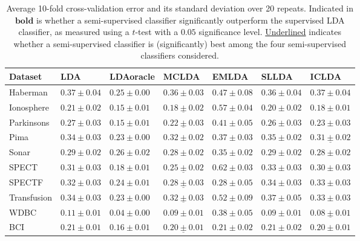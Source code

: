 \begin{table*}
\caption{Average 10-fold cross-validation error and its standard deviation over 20 repeats. Indicated in $\mathbf{bold}$ is whether a semi-supervised classifier significantly outperform the supervised LDA classifier, as measured using a $t$-test with a $0.05$ significance level. \underline{Underlined} indicates whether a semi-supervised classifier is (significantly) best among the four semi-supervised classifiers considered.} \label{table:cvresults-error}
\centering
\begin{tabular}{|l|llllll|}
\hline
Dataset & LDA & LDAoracle & MCLDA & EMLDA & SLLDA & ICLDA \\ 
\hline
Haberman & $0.37 \pm 0.04$& $0.25 \pm 0.00$& $0.36 \pm 0.03$& $0.47 \pm 0.08$& $0.36 \pm 0.04$& $0.37 \pm 0.04$\\ 
Ionosphere & $0.21 \pm 0.02$& $0.15 \pm 0.01$& $\mathbf{\underline{0.18 \pm 0.02}} $& $0.57 \pm 0.04$& $0.20 \pm 0.02$& $\mathbf{0.18 \pm 0.01} $\\ 
Parkinsons & $0.27 \pm 0.03$& $0.15 \pm 0.01$& $\mathbf{\underline{0.22 \pm 0.03}} $& $0.41 \pm 0.05$& $0.26 \pm 0.03$& $\mathbf{0.23 \pm 0.03} $\\ 
Pima & $0.34 \pm 0.03$& $0.23 \pm 0.00$& $\mathbf{0.32 \pm 0.02} $& $0.37 \pm 0.03$& $0.35 \pm 0.02$& $\mathbf{\underline{0.31 \pm 0.02}} $\\ 
Sonar & $0.29 \pm 0.02$& $0.26 \pm 0.02$& $0.28 \pm 0.02$& $0.35 \pm 0.02$& $0.29 \pm 0.02$& $0.28 \pm 0.02$\\ 
SPECT & $0.31 \pm 0.03$& $0.18 \pm 0.01$& $\mathbf{\underline{0.25 \pm 0.02}} $& $0.62 \pm 0.03$& $0.33 \pm 0.03$& $0.30 \pm 0.03$\\ 
SPECTF & $0.32 \pm 0.03$& $0.24 \pm 0.01$& $\mathbf{\underline{0.28 \pm 0.03}} $& $\mathbf{0.28 \pm 0.05} $& $0.34 \pm 0.03$& $0.33 \pm 0.03$\\ 
Transfusion & $0.34 \pm 0.03$& $0.23 \pm 0.00$& $\mathbf{\underline{0.32 \pm 0.03}} $& $0.52 \pm 0.09$& $0.37 \pm 0.05$& $0.33 \pm 0.03$\\ 
WDBC & $0.11 \pm 0.01$& $0.04 \pm 0.00$& $\mathbf{0.09 \pm 0.01} $& $0.38 \pm 0.05$& $\mathbf{0.09 \pm 0.01} $& $\mathbf{\underline{0.08 \pm 0.01}} $\\ 
BCI & $0.21 \pm 0.01$& $0.16 \pm 0.01$& $\mathbf{\underline{0.20 \pm 0.01}} $& $0.21 \pm 0.02$& $0.21 \pm 0.02$& $\mathbf{0.20 \pm 0.01} $\\ 
\hline
\end{tabular}
\end{table*}
